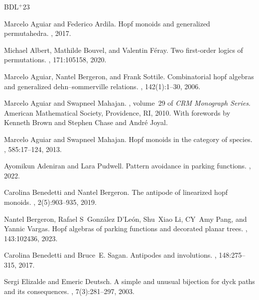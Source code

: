 \documentclass[12pt, reqno]{amsart}
\theoremstyle{definition}
\begin{document}

\newcommand{\etalchar}[1]{$^{#1}$}
\begin{thebibliography}{BDL{\etalchar{+}}23}

Marcelo Aguiar and Federico Ardila.
\newblock Hopf monoids and generalized permutahedra.
, 2017.

Michael Albert, Mathilde Bouvel, and Valentin F{\'e}ray.
\newblock Two first-order logics of permutations.
, 171:105158, 2020.

Marcelo Aguiar, Nantel Bergeron, and Frank Sottile.
\newblock Combinatorial hopf algebras and generalized dehn--sommerville
  relations.
, 142(1):1--30, 2006.

Marcelo Aguiar and Swapneel Mahajan.
, volume~29 of
  {\em CRM Monograph Series}.
\newblock American Mathematical Society, Providence, RI, 2010.
\newblock With forewords by Kenneth Brown and Stephen Chase and Andr\'{e}
  Joyal.

Marcelo Aguiar and Swapneel Mahajan.
\newblock Hopf monoids in the category of species.
, 585:17--124, 2013.

Ayomikun Adeniran and Lara Pudwell.
\newblock Pattern avoidance in parking functions.
, 2022.

Carolina Benedetti and Nantel Bergeron.
\newblock The antipode of linearized hopf monoids.
, 2(5):903--935, 2019.

\bibitem[BDL{\etalchar{+}}23]{BGLPV2021}
Nantel Bergeron, Rafael S~Gonz{\'a}lez D'Le{\'o}n, Shu~Xiao Li, CY~Amy Pang,
  and Yannic Vargas.
\newblock Hopf algebras of parking functions and decorated planar trees.
, 143:102436, 2023.

Carolina Benedetti and Bruce~E. Sagan.
\newblock Antipodes and involutions.
, 148:275--315, 2017.

Sergi Elizalde and Emeric Deutsch.
\newblock A simple and unusual bijection for dyck paths and its consequences.
, 7(3):281--297, 2003.


\end{thebibliography}
\end{document}
